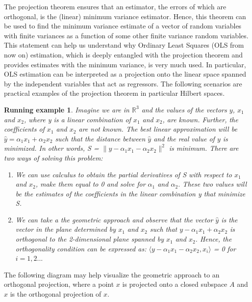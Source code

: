 \documentclass{article}
\newtheorem*{exmpl}{Running example}
\begin{document}
The projection theorem ensures that an estimator, the errors of which are orthogonal, is the (linear) minimum variance estimator. Hence, this theorem can be used to find the minimum variance estimate of a vector of random variables with finite variances as a function of some other finite variance random variables. This statement can help us understand why Ordinary Least Squares (OLS from now on) estimation, which is deeply entangled with the projection theorem and provides estimates with the minimum variance, is very much used. In particular, OLS estimation can be interpreted as a projection onto the linear space spanned by the independent variables that act as regressors. The following scenarios are practical examples of the projection theorem in particular Hilbert spaces. \newline

\begin{exmpl}
Imagine we are in $\mathbb{R}^3$ and the values of the vectors $y$, $x_1$ and $x_2$, where y is a linear combination of $x_1$ and $x_2$, are known. Further, the coefficients of $x_1$ and $x_2$ are not known. The best linear approximation will be $\hat{y} = \alpha_1x_1 + \alpha_2x_2$ such that the distance between $\hat{y}$ and the real value of $y$ is minimized. In other words, S = $\lVert y -  \alpha_1x_1 - \alpha_2x_2 \rVert^2$ is minimum.
There are two ways of solving this problem:
\begin{enumerate}
\item We can use calculus to obtain the partial derivatives of S with respect to $x_1$ and $x_2$, make them equal to 0 and solve for $\alpha_1$ and $\alpha_2$. These two values will be the estimates of the coefficients in the linear combination y that minimize S.
\item We can take a the geometric approach and observe that the vector $\hat{y}$ is the vector in the plane determined by $x_1$ and $x_2$ such that $y - \alpha_1x_1 + \alpha_2x_2$ is orthogonal to the 2-dimensional plane spanned by $x_1$ and $x_2$. Hence, the orthogonality condition can be expressed as: $\langle y - \alpha_1x_1 - \alpha_2x_2, x_i \rangle$ = 0 for $i = 1,2...$ \newline
\end{enumerate} 
\end{exmpl}

The following diagram may help visualize the geometric approach to an orthogonal projection, where a point $x$ is projected onto a closed subspace $A$ and $\hat{x}$ is the orthogonal projection of $x$.
\end{document}
